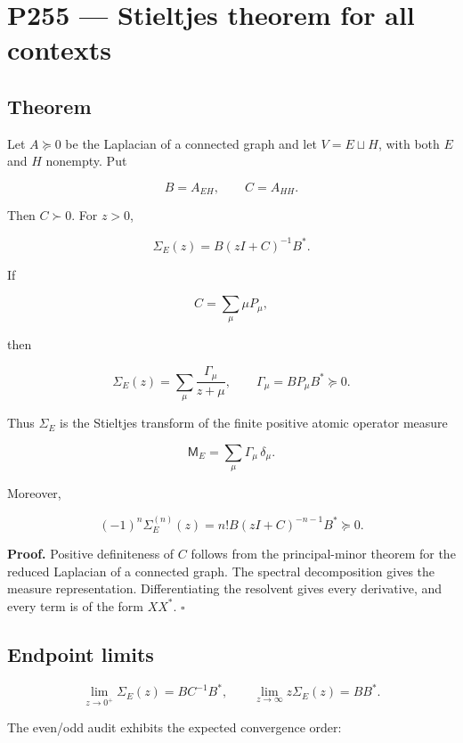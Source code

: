 \documentclass[11pt,a4paper,openany]{report}
\begin{document}
\chapter{P255 --- Stieltjes theorem for all contexts}

\section{Theorem}

Let \(A\succeq0\) be the Laplacian of a connected graph and let \(V=E\sqcup H\), with both \(E\) and \(H\) nonempty. Put

\[
B=A_{EH},\qquad C=A_{HH}.
\]

Then \(C\succ0\). For \(z>0\),

\[
\Sigma_E(z)=B(zI+C)^{-1}B^\ast.
\]

If

\[
C=\sum_\mu\mu P_\mu,
\]

then

\[
\Sigma_E(z)
=
\sum_\mu\frac{\Gamma_\mu}{z+\mu},
\qquad
\Gamma_\mu=BP_\mu B^\ast\succeq0.
\]

Thus \(\Sigma_E\) is the Stieltjes transform of the finite positive atomic operator measure

\[
\mathsf M_E=\sum_\mu\Gamma_\mu\,\delta_\mu.
\]

Moreover,

\[
(-1)^n\Sigma_E^{(n)}(z)
=
n!B(zI+C)^{-n-1}B^\ast\succeq0.
\]

\textbf{Proof.} Positive definiteness of \(C\) follows from the principal-minor theorem for the reduced Laplacian of a connected graph. The spectral decomposition gives the measure representation. Differentiating the resolvent gives every derivative, and every term is of the form \(XX^\ast\). \(\square\)

\section{Endpoint limits}

\[
\lim_{z\to0^+}\Sigma_E(z)=BC^{-1}B^\ast,
\qquad
\lim_{z\to\infty}z\Sigma_E(z)=BB^\ast.
\]

The even/\allowbreak{}odd audit exhibits the expected convergence order:
\end{document}
